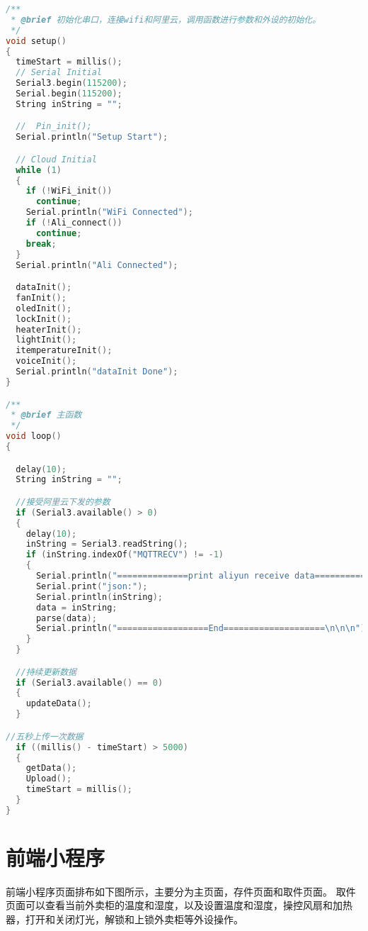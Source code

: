 \documentclass[12pt,hyperref,a4paper,UTF8]{ctexart}
\begin{document}
\begin{lstlisting}[language=C++]
  /**
 * @brief 初始化串口，连接wifi和阿里云，调用函数进行参数和外设的初始化。
 */
void setup()
{
  timeStart = millis();
  // Serial Initial
  Serial3.begin(115200);
  Serial.begin(115200);
  String inString = "";

  //  Pin_init();
  Serial.println("Setup Start");

  // Cloud Initial
  while (1)
  {
    if (!WiFi_init())
      continue;
    Serial.println("WiFi Connected");
    if (!Ali_connect())
      continue;
    break;
  }
  Serial.println("Ali Connected");

  dataInit();
  fanInit();
  oledInit();
  lockInit();
  heaterInit();
  lightInit();
  itemperatureInit();
  voiceInit();
  Serial.println("dataInit Done");
}

/**
 * @brief 主函数
 */
void loop()
{

  delay(10);
  String inString = "";

  //接受阿里云下发的参数
  if (Serial3.available() > 0)
  {
    delay(10);
    inString = Serial3.readString();
    if (inString.indexOf("MQTTRECV") != -1)
    {
      Serial.println("==============print aliyun receive data================");
      Serial.print("json:");
      Serial.println(inString);
      data = inString;
      parse(data);
      Serial.println("==================End====================\n\n\n");
    }
  }

  //持续更新数据
  if (Serial3.available() == 0)
  {
    updateData();
  }

//五秒上传一次数据
  if ((millis() - timeStart) > 5000)
  { 
    getData();
    Upload();
    timeStart = millis();
  }
}

\end{lstlisting}




\newpage

\section{前端小程序}
前端小程序页面排布如下图所示，主要分为主页面，存件页面和取件页面。
取件页面可以查看当前外卖柜的温度和湿度，以及设置温度和湿度，操控风扇和加热器，打开和关闭灯光，解锁和上锁外卖柜等外设操作。
\end{document}
